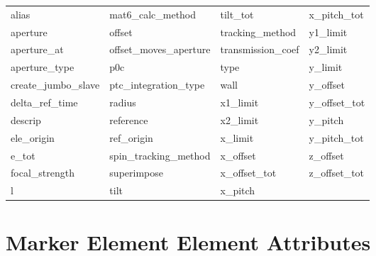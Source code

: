  \begin{tabular}{llll} \toprule
alias                       & mat6_calc_method            & tilt_tot                    & x_pitch_tot                 \\
aperture                    & offset                      & tracking_method             & y1_limit                    \\
aperture_at                 & offset_moves_aperture       & transmission_coef           & y2_limit                    \\
aperture_type               & p0c                         & type                        & y_limit                     \\
create_jumbo_slave          & ptc_integration_type        & wall                        & y_offset                    \\
delta_ref_time              & radius                      & x1_limit                    & y_offset_tot                \\
descrip                     & reference                   & x2_limit                    & y_pitch                     \\
ele_origin                  & ref_origin                  & x_limit                     & y_pitch_tot                 \\
e_tot                       & spin_tracking_method        & x_offset                    & z_offset                    \\
focal_strength              & superimpose                 & x_offset_tot                & z_offset_tot                \\
l                           & tilt                        & x_pitch                     &                             \\
 \bottomrule
 \end{tabular}
 \vfill
 
 \section{Marker Element Element Attributes}
 \label{s:list.marker}
 
